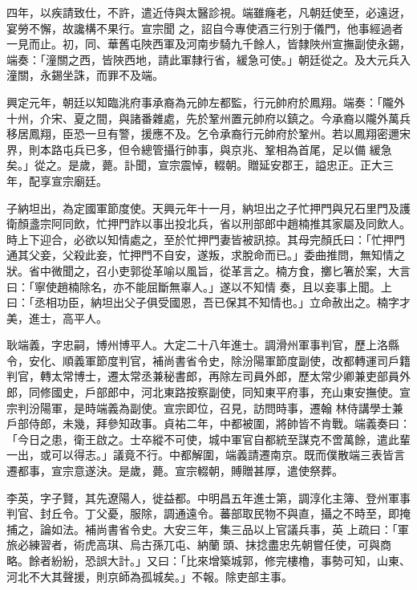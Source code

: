 \begin{pinyinscope}
 四年，以疾請致仕，不許，遣近侍與太醫診視。端雖癃老，凡朝廷使至，必遠迓，宴勞不懈，故讒構不果行。宣宗聞
 之，詔自今專使酒三行別于儀門，他事經過者一見而止。初，同、華舊屯陜西軍及河南步騎九千餘人，皆隸陜州宣撫副使永錫，端奏：「潼關之西，皆陜西地，請此軍隸行省，緩急可使。」朝廷從之。及大元兵入潼關，永錫坐誅，而罪不及端。



 興定元年，朝廷以知臨洮府事承裔為元帥左都監，行元帥府於鳳翔。端奏：「隴外十州，介宋、夏之間，與諸番雜處，先於鞏州置元帥府以鎮之。今承裔以隴外萬兵移居鳳翔，臣恐一旦有警，援應不及。乞令承裔行元帥府於鞏州。若以鳳翔密邇宋界，則本路屯兵已多，但令總管攝行帥事，與京兆、鞏相為首尾，足以備
 緩急矣。」從之。是歲，薨。訃聞，宣宗震悼，輟朝。贈延安郡王，謚忠正。正大三年，配享宣宗廟廷。



 子納坦出，為定國軍節度使。天興元年十一月，納坦出之子忙押門與兄石里門及護衛顏盞宗阿同飲，忙押門詐以事出投北兵，省以刑部郎中趙楠推其家屬及同飲人。時上下迎合，必欲以知情處之，至於忙押門妻皆被訊掠。其母完顏氏曰：「忙押門通其父妾，父殺此妾，忙押門不自安，遂叛，求脫命而已。」委曲推問，無知情之狀。省中微聞之，召小吏郭從革喻以風旨，從革言之。楠方食，擲匕箸於案，大言曰：「寧使趙楠除名，亦不能屈斷無辜人。」遂以不知情
 奏，且以妾事上聞。上曰：「丞相功臣，納坦出父子俱受國恩，吾已保其不知情也。」立命赦出之。楠字才美，進士，高平人。



 耿端義，字忠嗣，博州博平人。大定二十八年進士。調滑州軍事判官，歷上洛縣令，安化、順義軍節度判官，補尚書省令史，除汾陽軍節度副使，改都轉運司戶籍判官，轉太常博士，遷太常丞兼秘書郎，再除左司員外郎，歷太常少卿兼吏部員外郎，同修國史，戶部郎中，河北東路按察副使，同知東平府事，充山東安撫使。宣宗判汾陽軍，是時端義為副使。宣宗即位，召見，訪問時事，遷翰
 林侍講學士兼戶部侍郎，未幾，拜參知政事。貞祐二年，中都被圍，將帥皆不肯戰。端義奏曰：「今日之患，衛王啟之。士卒縱不可使，城中軍官自都統至謀克不啻萬餘，遣此輩一出，或可以得志。」議竟不行。中都解圍，端義請遷南京。既而僕散端三表皆言遷都事，宣宗意遂決。是歲，薨。宣宗輟朝，賻贈甚厚，遣使祭葬。



 李英，字子賢，其先遼陽人，徙益都。中明昌五年進士第，調淳化主簿、登州軍事判官、封丘令。丁父憂，服除，調通遠令。蕃部取民物不與直，攝之不時至，即掩捕之，論如法。補尚書省令史。大安三年，集三品以上官議兵事，英
 上疏曰：「軍旅必練習者，術虎高琪、烏古孫兀屯、納蘭頭、抹捻盡忠先朝嘗任使，可與商略。餘者紛紛，恐誤大計。」又曰：「比來增築城郭，修完樓櫓，事勢可知，山東、河北不大其聲援，則京師為孤城矣。」不報。除吏部主事。




\end{pinyinscope}
